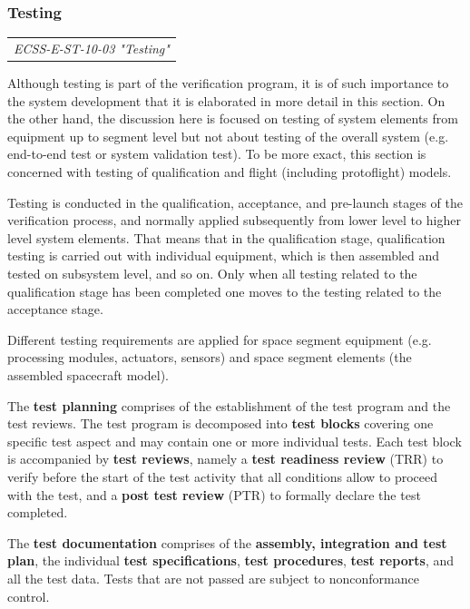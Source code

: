 \subsubsection{Testing}

\begin{tabular}{l}
\textit{ECSS-E-ST-10-03 "Testing" \cite{ECSS-E-ST-10-03}}
\end{tabular}

Although testing is part of the verification program, it is of such importance to the system development that it is elaborated in more detail in this section. On the other hand, the discussion here is focused on testing of system elements from equipment up to segment level but not about testing of the overall system (e.g. end-to-end test or system validation test). To be more exact, this section is concerned with testing of qualification and flight (including protoflight) models.

Testing is conducted in the qualification, acceptance, and pre-launch stages of the verification process, and normally applied subsequently from lower level to higher level system elements. That means that in the qualification stage, qualification testing is carried out with individual equipment, which is then assembled and tested on subsystem level, and so on. Only when all testing related to the qualification stage has been completed one moves to the testing related to the acceptance stage.

Different testing requirements are applied for space segment equipment (e.g. processing modules, actuators, sensors) and space segment elements (the assembled spacecraft model). 

The \textbf{test planning} comprises of the establishment of the test program and the test reviews. The test program is decomposed into \textbf{test blocks} covering one specific test aspect and may contain one or more individual tests. Each test block is accompanied by \textbf{test reviews}, namely a \textbf{test readiness review} (TRR) to verify before the start of the test activity that all conditions allow to proceed with the test, and a \textbf{post test review} (PTR) to formally declare the test completed. 

The \textbf{test documentation} comprises of the \textbf{assembly, integration and test plan}, the individual \textbf{test specifications}, \textbf{test procedures}, \textbf{test reports}, and all the test data. Tests that are not passed are subject to nonconformance control.
 
